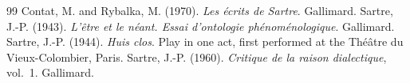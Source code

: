 \documentclass{situationist-preprint}
\begin{document}
\begin{thebibliography}{99}\small
{} Contat, M. and Rybalka, M. (1970). \emph{Les écrits de Sartre}. Gallimard.
 Sartre, J.-P. (1943). \emph{L'être et le néant. Essai d'ontologie phénoménologique}. Gallimard.
 Sartre, J.-P. (1944). \emph{Huis clos}. Play in one act, first performed at the Théâtre du Vieux-Colombier, Paris.
 Sartre, J.-P. (1960). \emph{Critique de la raison dialectique}, vol.~1. Gallimard.
\end{thebibliography}
\end{document}
